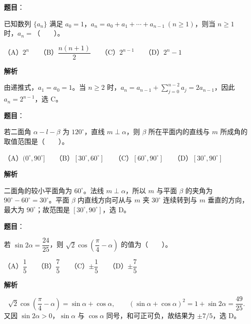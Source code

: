 \begin{answer}

\textbf{题目}：

已知数列 $\{a_n\}$ 满足 $a_0=1$，$a_n=a_0+a_1+\cdots+a_{n-1}\ (n\geq 1)$，则当 $n\geq 1$ 时，$a_n=$\mbox{（　　）}。

（A）$2^n$　　（B）$\dfrac{n(n+1)}{2}$　　（C）$2^{n-1}$　　（D）$2^n-1$

\textbf{解析}

由递推式，$a_1=a_0=1$。当 $n\ge2$ 时，$a_n=a_{n-1}+\sum_{j=0}^{n-2}a_j=2a_{n-1}$，因此 $a_n=2^{n-1}$，选 C。


\end{answer}
\begin{answer}

\textbf{题目}：

若二面角 $\alpha-l-\beta$ 为 $120^\circ$，直线 $m\perp\alpha$，则 $\beta$ 所在平面内的直线与 $m$ 所成角的取值范围是\mbox{（　　）}。

（A）$(0^\circ,90^\circ]$　　（B）$[30^\circ,60^\circ]$　　（C）$[60^\circ,90^\circ]$　　（D）$[30^\circ,90^\circ]$

\textbf{解析}

二面角的较小平面角为 $60^\circ$。法线 $m\perp\alpha$，所以 $m$ 与平面 $\beta$ 的夹角为 $90^\circ-60^\circ=30^\circ$。平面 $\beta$ 内直线方向可从与 $m$ 夹 $30^\circ$ 连续转到与 $m$ 垂直的方向，最大为 $90^\circ$；故范围是 $[30^\circ,90^\circ]$，选 D。


\end{answer}
\begin{answer}

\textbf{题目}：

若 $\sin 2\alpha=\dfrac{24}{25}$，则 $\sqrt{2}\cos\left(\dfrac{\pi}{4}-\alpha\right)$ 的值为\mbox{（　　）}。

（A）$\dfrac{1}{5}$　　（B）$\dfrac{7}{5}$　　（C）$\pm\dfrac{1}{5}$　　（D）$\pm\dfrac{7}{5}$

\textbf{解析}

\nopagebreak[4]
\[
\sqrt2\cos\left(\frac\pi4-\alpha\right)=\sin\alpha+\cos\alpha,
\qquad (\sin\alpha+\cos\alpha)^2=1+\sin2\alpha=\frac{49}{25}.
\]
又因 $\sin2\alpha>0$，$\sin\alpha$ 与 $\cos\alpha$ 同号，和可正可负，故结果为 $\pm7/5$，选 D。


\end{answer}
